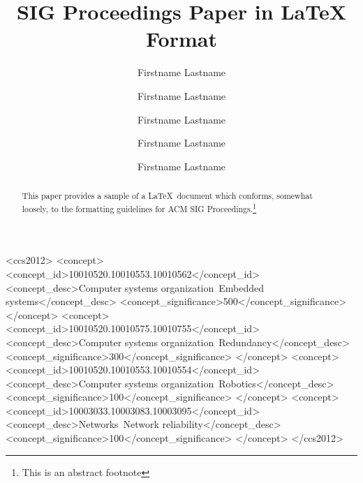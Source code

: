 \documentclass[10pt,sigconf,anonymous]{acmart}
\begin{document}
\title{SIG Proceedings Paper in LaTeX Format}

\author{Firstname Lastname}

\author{Firstname Lastname}

\author{Firstname Lastname}

\author{Firstname Lastname}

\author{Firstname Lastname}

\renewcommand{\shortauthors}{F. Lastname et al.}

\begin{abstract}
  This paper provides a sample of a \LaTeX\ document which conforms,
  somewhat loosely, to the formatting guidelines for
  ACM SIG Proceedings.\footnote{This is an abstract footnote}
\end{abstract}

%
%
\begin{CCSXML}
  <ccs2012>
  <concept>
  <concept_id>10010520.10010553.10010562</concept_id>
  <concept_desc>Computer systems organization~Embedded systems</concept_desc>
  <concept_significance>500</concept_significance>
  </concept>
  <concept>
  <concept_id>10010520.10010575.10010755</concept_id>
  <concept_desc>Computer systems organization~Redundancy</concept_desc>
  <concept_significance>300</concept_significance>
  </concept>
  <concept>
  <concept_id>10010520.10010553.10010554</concept_id>
  <concept_desc>Computer systems organization~Robotics</concept_desc>
  <concept_significance>100</concept_significance>
  </concept>
  <concept>
  <concept_id>10003033.10003083.10003095</concept_id>
  <concept_desc>Networks~Network reliability</concept_desc>
  <concept_significance>100</concept_significance>
  </concept>
  </ccs2012>
\end{CCSXML}
\end{document}
